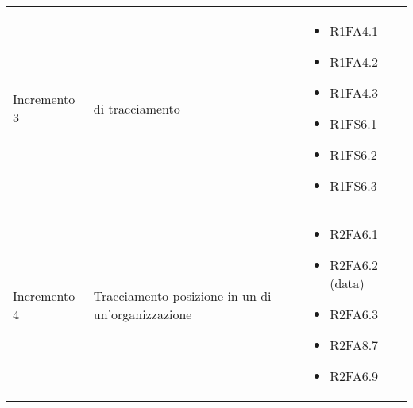 {\begin{longtable}{C{4cm} C{6cm} C{4cm}}
Incremento 3 &  di tracciamento & \begin{itemize}
    \item[ ] R1FA4.1
    \item[ ] R1FA4.2
    \item[ ] R1FA4.3
    \item[ ] R1FS6.1
    \item[ ] R1FS6.2
    \item[ ] R1FS6.3
\end{itemize}\\

Incremento 4 & Tracciamento posizione in un  di un'organizzazione & \begin{itemize}
    \item[ ] R2FA6.1
    \item[ ] R2FA6.2 (data)
    \item[ ] R2FA6.3
    \item[ ] R2FA8.7
    \item[ ] R2FA6.9
\end{itemize}\\


\end{longtable}
}


